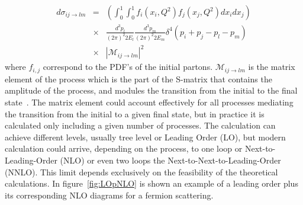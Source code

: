 \begin{eqnarray}
  \label{eq:DiffXS}
  d\sigma_{ij\rightarrow lm} & = & \left( \int_{0}^{1}\int_{0}^{1}f_{i}(x_{i},Q^{2})f_{j}(x_{j},Q^{2})dx_{i}dx_{j} \right) \nonumber \\  
 & \times & \frac{d^{3}p_{l}}{(2\pi)^{2}2E_{l}}\frac{d^{3}p_{m}}{(2\pi)^{2}2E_{m}}\delta^{4}\left( p_{i}+p_{j}-p_{l}-p_{m} \right) \nonumber \\  
 & \times & |\mathcal{M}_{ij\rightarrow lm}|^{2}
\end{eqnarray} where $f_{i,j}$ correspond to the PDF's of the initial partons. $\mathcal{M}_{ij\rightarrow lm}$ is the matrix element of the process which is the part of the S-matrix that contains the amplitude of the process, and modules the transition from the initial to the final state~\cite{opac-b1131978}. The matrix element could account effectively for all processes mediating the transition from the initial to a given final state, but in practice it is calculated only including a given number of processes. The calculation can achieve different levels, usually tree level or Leading Order (LO), but modern calculation could arrive, depending on the process, to one loop or Next-to-Leading-Order (NLO) or even two loops the  Next-to-Next-to-Leading-Order (NNLO). This limit depends exclusively on the feasibility of the theoretical calculations. In figure~\ref{fig:LOpNLO} is shown an example of a leading order plus its corresponding NLO diagrams for a fermion scattering.


